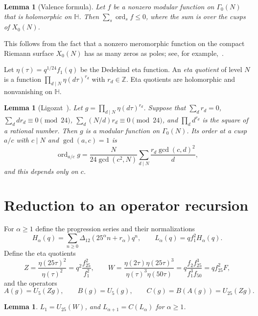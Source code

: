 \documentclass[11pt]{article}
\newtheorem{lemma}[theorem]{Lemma}
\theoremstyle{definition}
\theoremstyle{remark}
\numberwithin{equation}{section}
\newcommand{\ord}{\operatorname{ord}}
\newcommand{\Z}{\mathbb{Z}}
\newcommand{\HH}{\mathbb{H}}
\begin{document}
\begin{lemma}[Valence formula]\label{lem:valence}
Let $f$ be a nonzero modular function on $\Gamma_0(N)$ that is holomorphic on $\HH$. Then $\sum_s\ord_sf\le0$, where the sum is over the cusps of $X_0(N)$.
\end{lemma}

This follows from the fact that a nonzero meromorphic function on the compact Riemann surface $X_0(N)$ has as many zeros as poles; see, for example,~\cite[Chapter~4]{Ra}.

Let $\eta(\tau)=q^{1/24}f_1(q)$ be the Dedekind eta function. An \emph{eta quotient} of level $N$ is a function $\prod_{d\mid N}\eta(d\tau)^{r_d}$ with $r_d\in\Z$. Eta quotients are holomorphic and nonvanishing on $\HH$.

\begin{lemma}[Ligozat~\cite{Lig}]\label{lem:ligozat}
Let $g=\prod_{d\mid N}\eta(d\tau)^{r_d}$. Suppose that $\sum_dr_d=0$, $\sum_ddr_d\equiv0\pmod{24}$, $\sum_d(N/d)r_d\equiv0\pmod{24}$, and $\prod_dd^{r_d}$ is the square of a rational number. Then $g$ is a modular function on $\Gamma_0(N)$. Its order at a cusp $a/c$ with $c\mid N$ and $\gcd(a,c)=1$ is
\begin{equation}\label{eq:ordformula}
\ord_{a/c}g=\frac{N}{24\gcd(c^2,N)}\sum_{d\mid N}\frac{r_d\gcd(c,d)^2}{d},
\end{equation}
and this depends only on $c$.
\end{lemma}

\section{Reduction to an operator recursion}\label{sec:recursion}

For $\alpha\ge1$ define the progression series and their normalizations
\[
H_\alpha(q)=\sum_{n\ge0}\Delta_{12}(25^\alpha n+r_\alpha)q^n,\qquad L_\alpha(q)=qf_1^2H_\alpha(q).
\]
Define the eta quotients
\begin{equation}\label{eq:ZW}
Z=\frac{\eta(25\tau)^2}{\eta(\tau)^2}=q^2\frac{f_{25}^2}{f_1^2},\qquad
W=\frac{\eta(2\tau)\eta(25\tau)^3}{\eta(\tau)^3\eta(50\tau)}=q\frac{f_2f_{25}^3}{f_1^3f_{50}}=qf_{25}^2F,
\end{equation}
and the operators
\begin{equation}\label{eq:ABC}
A(g)=U_5(Zg),\qquad B(g)=U_5(g),\qquad C(g)=B(A(g))=U_{25}(Zg).
\end{equation}

\begin{lemma}\label{lem:Lrec}
$L_1=U_{25}(W)$, and $L_{\alpha+1}=C(L_\alpha)$ for $\alpha\ge1$.
\end{lemma}
\end{document}
